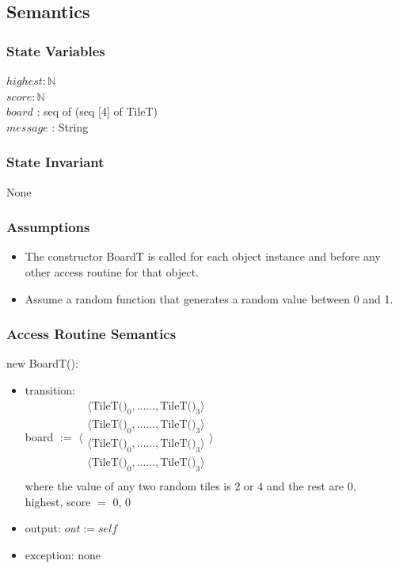 \documentclass[12pt]{article}
\begin{document}
\subsection* {Semantics}

\subsubsection* {State Variables}
$highest : \mathbb{N}$\\   
$score : \mathbb{N}$\\
$board$ : seq of (seq [4] of TileT)\\
$message$ : String\\

\subsubsection* {State Invariant}

None

\subsubsection* {Assumptions}
\begin{itemize}
  \item The constructor BoardT is called for each object instance and before any other access routine for that object.
  \item Assume a random function that generates a random value between 0 and 1.
\end{itemize}

\subsubsection* {Access Routine Semantics}

\noindent new BoardT():
\begin{itemize}
\item transition: \\
     board $:=$
     $\langle \begin{array}{c}
      \langle \mbox{TileT()}_0, ... ... ,\mbox{TileT()}_3 \rangle\\
      \langle \mbox{TileT()}_0, ... ... ,\mbox{TileT()}_3 \rangle\\
      \langle \mbox{TileT()}_0, ... ... ,\mbox{TileT()}_3 \rangle\\
      \langle \mbox{TileT()}_0, ... ... ,\mbox{TileT()}_3 \rangle\\
      \end{array} \rangle $ \\ 
      where the value of any two random tiles is $2$ or $4$ and the rest are $0$,\\
      highest, score $=$  0, 0
\item output: $out := \mathit{self}$
\item exception: none
\end{itemize}
\end{document}
